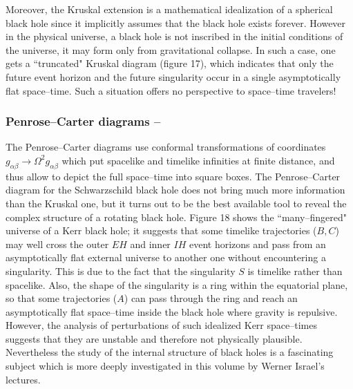\documentclass[12pt]{article}
\begin{document}
Moreover, the Kruskal extension is a mathematical idealization of a 
spherical black hole since it implicitly assumes that the black hole 
exists forever. However in the physical universe, a black hole is not inscribed
 in the initial conditions of the universe, it may form only from gravitational collapse. 
In such a case, one gets a ``truncated" Kruskal diagram (figure 17), 
which indicates that only the future event horizon and the future 
singularity occur in a single asymptotically flat space--time. Such 
a situation offers no perspective to space--time travelers!
 

\subsubsection{Penrose--Carter diagrams --}

The Penrose--Carter diagrams use conformal transformations of 
coordinates $g_{\alpha \beta} \to \Omega^{2}g_{\alpha \beta}$ which 
put spacelike and timelike infinities at finite distance, and thus 
allow to depict the full space--time into square boxes. The 
Penrose--Carter diagram for the Schwarzschild black hole does not 
bring much more information than the Kruskal one, but it turns 
out to be the best available tool to reveal the complex structure of a rotating black hole.
Figure 18 shows the ``many--fingered" universe of a Kerr black hole; 
it suggests that some timelike trajectories ($B,C$) may well cross the 
outer $EH$
and inner $IH$
event horizons and pass from an asymptotically flat external universe to 
another one without encountering a singularity. This is due to the fact 
that the singularity $S$ is timelike 
rather than spacelike. Also, the shape of the singularity is a ring 
within the equatorial plane, so that some trajectories ($A$) can pass 
through the ring and reach an asymptotically flat space--time inside 
the black hole where gravity is repulsive.
However, the analysis of perturbations of such idealized Kerr 
space--times suggests that they are unstable and therefore not physically plausible. 
Nevertheless the study of the  internal structure of black holes is a 
fascinating subject which is more deeply investigated in this 
volume by Werner Israel's lectures.
\end{document}
